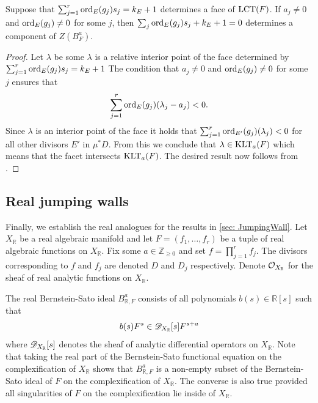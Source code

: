 \begin{corollary}\label{cor: LCT}
  Suppose that $\sum_{j=1}^r \operatorname{ord}_E(g_j)s_j = k_E + 1$ determines a face of $\operatorname{LCT}(F)$.
  If $a_j\neq 0$ and $\operatorname{ord}_{E}(g_j)\neq 0$ for some $j$, then $\sum_j \operatorname{ord}_{E}(g_j)s_j +k_E + 1=0$ determines a component of $Z(B_F^a)$.
\end{corollary}
\begin{proof}
  Let $\lambda$ be some $\lambda$ is a relative interior point of the face determined by $\sum_{j=1}^r \operatorname{ord}_E(g_j)s_j = k_E + 1$
  The condition that $a_j\neq 0$ and $\operatorname{ord}_{E}(g_j)\neq 0$ for some $j$ ensures that
  $$\sum_{j=1}^r \operatorname{ord}_{E}(g_j)(\lambda_j - a_j) < 0. $$
  Since $\lambda$ is an interior point of the face it holds that $\sum_{j=1}^r \operatorname{ord}_{E'}(g_j)(\lambda_j) < 0$ for all other divisors $E'$ in $\mu^*D$.
  From this we conclude that $\lambda \in \operatorname{KLT}_a(F)$ which means that the facet intersects $\operatorname{KLT}_a(F)$.
  The desired result now follows from .
\end{proof}
\subsection{Real jumping walls}\label{sec: RealJump}
Finally, we establish the real analogues for the results in \cref{sec: JumpingWall}.
Let $X_\mathbb{R}$ be a real algebraic manifold and let $F = (f_1,\ldots,f_r)$ be a tuple of real algebraic functions on $X_{\mathbb{R}}$.
Fix some $a\in \mathbb{Z}_{\geq 0}$ and set $f = \prod_{j=1}^r f_j$.
The divisors corresponding to $f$ and $f_j$ are denoted $D$ and $D_j$ respectively.
Denote $\mathcal{O}_{X_\mathbb{R}}$ for the sheaf of real analytic functions on $X_\mathbb{R}$.

The real Bernstein-Sato ideal $B_{\mathbb{R},F}^a$ consists of all polynomials $b(s)\in \mathbb{R}[s]$ such that
$$b(s)F^s \in \mathscr{D}_{X_\mathbb{R}}[s]F^{s+a}$$
where $\mathscr{D}_{X_\mathbb{R}}[s]$ denotes the sheaf of analytic differential operators on $X_\mathbb{R}$.
Note that taking the real part of the Bernstein-Sato functional equation on the complexification of $X_\mathbb{R}$ shows that $B_{\mathbb{R},F}^a$ is a non-empty subset of the Bernstein-Sato ideal of $F$ on the complexification of $X_\mathbb{R}$.
The converse is also true provided all singularities of $F$ on the complexification lie inside of $X_\mathbb{R}$.


